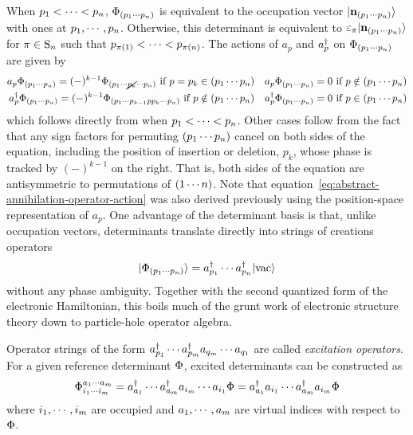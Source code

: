 \documentclass[11pt]{article}
\numberwithin{equation}{section}
\begin{document}
\begin{rmk}
When $p_1<\cdots<p_n$, $\Phi _{(p_1\cdots p_n)}$ is equivalent to the occupation vector $|\mathbf{n}_{(p_1\cdots p_n)}\rangle$ with ones at $p_1,\cdots,p_n$.
Otherwise, this determinant is equivalent to $\e_{\pi}\kt{\bo{n}_{(p_1\cd p_n)}}$ for $\pi\in\mr{S}_n$ such that $p_{\pi(1)}<\cd<p_{\pi(n)}$.
The actions of $a_p$ and $a_p^\dagger$ on $\Phi _{(p_1\cdots p_n)}$ are given by
\begin{align}\label{eq:abstract-annihilation-operator-action}
  a_p\Phi _{(p_1\cdots p_n)}
=
  (-)^{k-1}\Phi _{(p_1\cdots\cancel{p_k}\cdots p_n)}
  \ \text{if $p=p_k\in(p_1\cdots p_n)$}
&&
  a_p\Phi _{(p_1\cdots p_n)}
=
  0
  \ \text{if $p\notin(p_1\cdots p_n)$}
\\\label{eq:abstract-creation-operator-action}
  a_p^\dagger\Phi _{(p_1\cdots p_n)}
=
  (-)^{k-1}\Phi _{(p_1\cdots p_{k-1}pp_k\cdots p_n)}
  \ \text{if $p\notin(p_1\cdots p_n)$}
&&
  a_p^\dagger\Phi _{(p_1\cdots p_n)}
=
  0
  \ \text{if $p\in(p_1\cdots p_n)$}
\end{align}
which follows directly from  when $p_1<\cdots<p_n$.
Other cases follow from the fact that any sign factors for permuting $(p_1\cdots p_n)$ cancel on both sides of the equation, including the position of insertion or deletion, $p_k$, whose phase is tracked by $(-)^{k-1}$ on the right.
That is, both sides of the equation are antisymmetric to permutations of $(1\cdots n)$.
Note that equation~\ref{eq:abstract-annihilation-operator-action} was also derived previously using the position-space representation of $a_p$.
One advantage of the determinant basis is that, unlike occupation vectors, determinants translate directly into strings of creations operators
\begin{align}
  |\Phi _{(p_1\cdots p_n)}\rangle
=
  a_{p_1}^\dagger\cdots a_{p_n}^\dagger|\mathrm{vac}\rangle
\end{align}
without any phase ambiguity.
Together with the second quantized form of the electronic Hamiltonian, this boils much of the grunt work of electronic structure theory down to particle-hole operator algebra.
\end{rmk}

\begin{dfn}
Operator strings of the form $a_{p_1}^\dagger\cdots a_{p_m}^\dagger a_{q_m}\cdots a_{q_1}$ are called \textit{excitation operators}.
For a given reference determinant $\Phi $, excited determinants can be constructed as
\begin{align}
  \Phi _{i_1\cdots i_m}^{a_1\cdots a_m}
=
  a_{a_1}^\dagger\cdots a_{a_m}^\dagger a_{i_m}\cdots a_{i_1}\Phi 
=
  a_{a_1}^\dagger a_{i_1}\cdots a_{a_m}^\dagger a_{i_m}\Phi 
\end{align}
where $i_1,\cdots,i_m$ are occupied and $a_1,\cdots,a_m$ are virtual indices with respect to $\Phi $.
\end{dfn}
\end{document}
